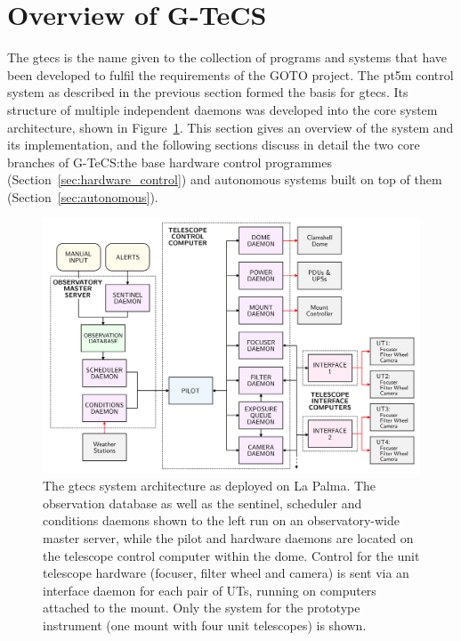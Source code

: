 
\newpage
\section{Overview of G-TeCS}
\label{sec:gtecs}
\begin{colsection}


\begin{colsection}

The \gls{gtecs} is the name given to the collection of programs and systems that have been developed to fulfil the requirements of the GOTO project. The \gls{pt5m} control system as described in the previous section formed the basis for \gls{gtecs}. Its structure of multiple independent daemons was developed into the core system architecture, shown in Figure~\ref{fig:flow}. This section gives an overview of the system and its implementation, and the following sections discuss in detail the two core branches of G-TeCS:\@ the base hardware control programmes (Section~\ref{sec:hardware_control}) and autonomous systems built on top of them (Section~\ref{sec:autonomous}).


\begin{figure}[p]
\begin{center}
\includegraphics[width=\linewidth]{images/flow.pdf}
\end{center}
\caption[The G-TeCS system architecture]{The \gls{gtecs} system architecture as deployed on La Palma. The observation database as well as the sentinel, scheduler and conditions daemons shown to the left run on an observatory-wide master server, while the pilot and hardware daemons are located on the telescope control computer within the dome. Control for the unit telescope hardware (focuser, filter wheel and camera) is sent via an interface daemon for each pair of UTs, running on computers attached to the mount. Only the system for the prototype instrument (one mount with four unit telescopes) is shown.}
\label{fig:flow}
\end{figure}


\end{colsection}
\end{colsection}
